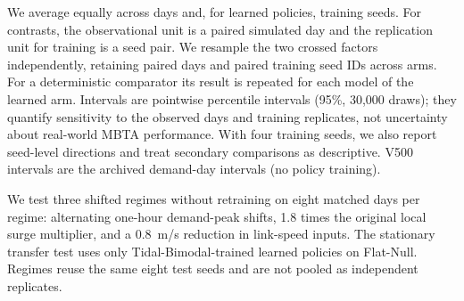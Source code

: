 We average equally across days and, for learned policies, training seeds. For contrasts, the observational unit is a paired simulated day and the replication unit for training is a seed pair. We resample the two crossed factors independently, retaining paired days and paired training seed IDs across arms. For a deterministic comparator its result is repeated for each model of the learned arm. Intervals are pointwise percentile intervals (95\%, 30,000 draws); they quantify sensitivity to the observed days and training replicates, not uncertainty about real-world MBTA performance. With four training seeds, we also report seed-level directions and treat secondary comparisons as descriptive. V500 intervals are the archived demand-day intervals (no policy training).

We test three shifted regimes without retraining on eight matched days per regime: alternating one-hour demand-peak shifts, 1.8 times the original local surge multiplier, and a 0.8~m/s reduction in link-speed inputs. The stationary transfer test uses only Tidal-Bimodal-trained learned policies on Flat-Null. Regimes reuse the same eight test seeds and are not pooled as independent replicates.
